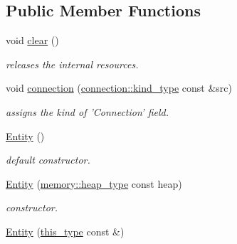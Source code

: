 \subsection*{Public Member Functions}
\begin{DoxyCompactItemize}
\item 
\hypertarget{classhryky_1_1http_1_1header_1_1_entity_ac968fd8ae6cc7d470643731d4b3e26a9}{void \hyperlink{classhryky_1_1http_1_1header_1_1_entity_ac968fd8ae6cc7d470643731d4b3e26a9}{clear} ()}\label{classhryky_1_1http_1_1header_1_1_entity_ac968fd8ae6cc7d470643731d4b3e26a9}

\begin{DoxyCompactList}\small\item\em releases the internal resources. \end{DoxyCompactList}\item 
\hypertarget{classhryky_1_1http_1_1header_1_1_entity_a57dc7c8fad8a93a81521c9c8f74fe527}{void \hyperlink{classhryky_1_1http_1_1header_1_1_entity_a57dc7c8fad8a93a81521c9c8f74fe527}{connection} (\hyperlink{classhryky_1_1_kind}{connection\-::kind\-\_\-type} const \&src)}\label{classhryky_1_1http_1_1header_1_1_entity_a57dc7c8fad8a93a81521c9c8f74fe527}

\begin{DoxyCompactList}\small\item\em assigns the kind of 'Connection' field. \end{DoxyCompactList}\item 
\hypertarget{classhryky_1_1http_1_1header_1_1_entity_a8f6f218b200018110dbc4c1bd9a29ef4}{\hyperlink{classhryky_1_1http_1_1header_1_1_entity_a8f6f218b200018110dbc4c1bd9a29ef4}{Entity} ()}\label{classhryky_1_1http_1_1header_1_1_entity_a8f6f218b200018110dbc4c1bd9a29ef4}

\begin{DoxyCompactList}\small\item\em default constructor. \end{DoxyCompactList}\item 
\hypertarget{classhryky_1_1http_1_1header_1_1_entity_aba14326fed0c6551a0f7cf69348a83dd}{\hyperlink{classhryky_1_1http_1_1header_1_1_entity_aba14326fed0c6551a0f7cf69348a83dd}{Entity} (\hyperlink{classhryky_1_1memory_1_1heap_1_1_base}{memory\-::heap\-\_\-type} const heap)}\label{classhryky_1_1http_1_1header_1_1_entity_aba14326fed0c6551a0f7cf69348a83dd}

\begin{DoxyCompactList}\small\item\em constructor. \end{DoxyCompactList}\item 
\hypertarget{classhryky_1_1http_1_1header_1_1_entity_a907bea36abd3d0576ba5c94bf3f4b62f}{\hyperlink{classhryky_1_1http_1_1header_1_1_entity_a907bea36abd3d0576ba5c94bf3f4b62f}{Entity} (\hyperlink{classhryky_1_1http_1_1header_1_1_entity_a2d6b33008fa9a1607970c743ee7ee545}{this\-\_\-type} const \&)}\label{classhryky_1_1http_1_1header_1_1_entity_a907bea36abd3d0576ba5c94bf3f4b62f}


\end{DoxyCompactItemize}
